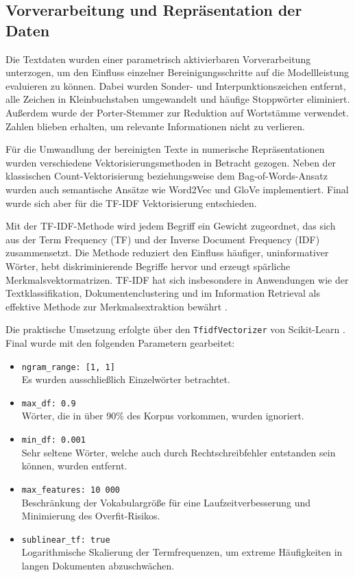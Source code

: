 \subsection{Vorverarbeitung und Repräsentation der Daten}
\label{sec:vorverarbeitung}

Die Textdaten wurden einer parametrisch aktivierbaren Vorverarbeitung unterzogen, um den Einfluss einzelner Bereinigungsschritte auf die Modellleistung evaluieren zu können. Dabei wurden Sonder- und Interpunktionszeichen entfernt, alle Zeichen in Kleinbuchstaben umgewandelt und häufige Stoppwörter eliminiert. Außerdem wurde der Porter-Stemmer \cite{Porter2006} zur Reduktion auf Wortstämme verwendet. Zahlen blieben erhalten, um relevante Informationen nicht zu verlieren.

Für die Umwandlung der bereinigten Texte in numerische Repräsentationen wurden verschiedene Vektorisierungsmethoden in Betracht gezogen. Neben der klassischen Count-Vektorisierung beziehungsweise dem Bag-of-Words-Ansatz wurden auch semantische Ansätze wie Word2Vec \cite{Mikolov2013} und GloVe \cite{Pennington2014} implementiert. Final wurde sich aber für die TF-IDF Vektorisierung entschieden.

Mit der TF-IDF-Methode wird jedem Begriff ein Gewicht zugeordnet, das sich aus der Term Frequency (TF) und der Inverse Document Frequency (IDF) zusammensetzt. Die Methode reduziert den Einfluss häufiger, uninformativer Wörter, hebt diskriminierende Begriffe hervor und erzeugt spärliche Merkmalsvektormatrizen. TF-IDF hat sich insbesondere in Anwendungen wie der Textklassifikation, Dokumentenclustering und im Information Retrieval als effektive Methode zur Merkmalsextraktion bewährt \cite{Manning2009}.

Die praktische Umsetzung erfolgte über den \texttt{TfidfVectorizer} von Scikit-Learn \cite{Pedregosa2011}. Final wurde mit den folgenden Parametern gearbeitet:
\begin{itemize}
    \item \texttt{ngram\_range: [1, 1]} \\ Es wurden ausschließlich Einzelwörter betrachtet.
    \item \texttt{max\_df: 0.9} \\ Wörter, die in über 90\% des Korpus vorkommen, wurden ignoriert.
    \item \texttt{min\_df: 0.001} \\ Sehr seltene Wörter, welche auch durch Rechtschreibfehler entstanden sein können, wurden entfernt.
    \item \texttt{max\_features: 10\,000} \\ Beschränkung der Vokabulargröße für eine Laufzeitverbesserung und Minimierung des Overfit-Risikos.
    \item \texttt{sublinear\_tf: true} \\ Logarithmische Skalierung der Termfrequenzen, um extreme Häufigkeiten in langen Dokumenten abzuschwächen.
\end{itemize}
